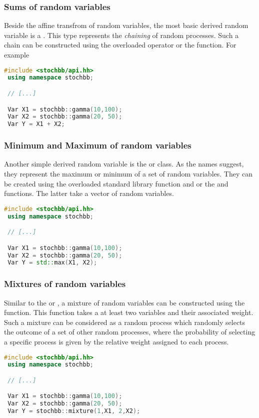 \subsubsection{Sums of random variables}
Beside the affine transfrom of random variables, the most basic derived random variable is a .
This type represents the \emph{chaining} of random processes. Such a chain can be constructed using 
the overloaded \code{+} operator or the  function. For example
\begin{lstlisting}[language=C++]
 #include <stochbb/api.hh>
 using namespace stochbb;

 // [...]

 Var X1 = stochbb::gamma(10,100);
 Var X2 = stochbb::gamma(20, 50);
 Var Y = X1 + X2;
\end{lstlisting}

\subsubsection{Minimum and Maximum of random variables}
Another simple derived random variable is the  or  class. As the
names suggest, they represent the maximum or minimum of a set of random variables. They can be
created using the overloaded standard library function  and  or the
 and  functions. The latter take a vector of random variables.
\begin{lstlisting}[language=C++]
 #include <stochbb/api.hh>
 using namespace stochbb;

 // [...]

 Var X1 = stochbb::gamma(10,100);
 Var X2 = stochbb::gamma(20, 50);
 Var Y = std::max(X1, X2);
\end{lstlisting}

\subsubsection{Mixtures of random variables}
Similar to the  or , a mixture of random variables can be
constructed using the  function. This function takes a at least 
two variables and their associated weight. Such a mixture can be considered as a random process which
randomly selects the outcome of a set of other random processes, where the probability of
selecting a specific process is given by the relative weight assigned to each process.
\begin{lstlisting}[language=C++]
 #include <stochbb/api.hh>
 using namespace stochbb;

 // [...]

 Var X1 = stochbb::gamma(10,100);
 Var X2 = stochbb::gamma(20, 50);
 Var Y = stochbb::mixture(1,X1, 2,X2);
\end{lstlisting}

